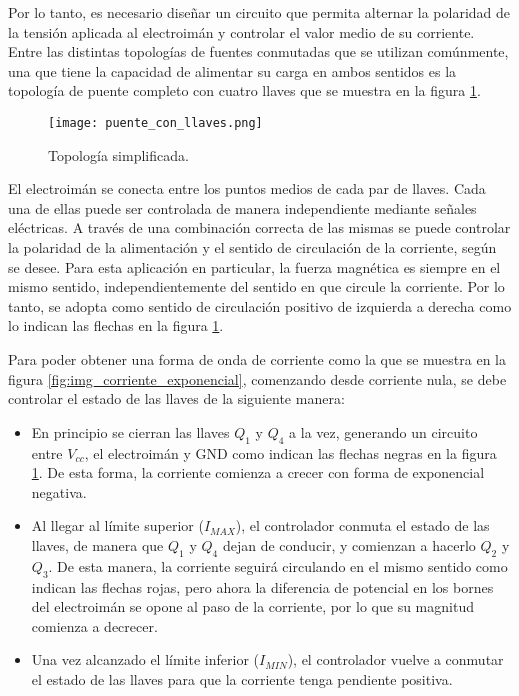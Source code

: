 
Por lo tanto, es necesario diseñar un circuito que permita alternar la polaridad de la tensión aplicada al electroimán y controlar el valor medio de su corriente. Entre las distintas topologías de fuentes conmutadas que se utilizan comúnmente, una que tiene la capacidad de alimentar su carga en ambos sentidos es la topología de puente completo con cuatro llaves que se muestra en la figura \ref{fig:img_topologia_simplificada}.

\begin{figure}[H]
	\centering
	\texttt{[image: puente\_con\_llaves.png]}
	\caption{Topología simplificada.}
	\label{fig:img_topologia_simplificada}
\end{figure} 


El electroimán se conecta entre los puntos medios de cada par de llaves. Cada una de ellas puede ser controlada de manera independiente mediante señales eléctricas. A través de una combinación correcta de las mismas se puede controlar la polaridad de la alimentación y el sentido de circulación de la corriente, según se desee. Para esta aplicación en particular, la fuerza magnética es siempre en el mismo sentido, independientemente del sentido en que circule la corriente. Por lo tanto, se adopta como sentido de circulación positivo de izquierda a derecha como lo indican las flechas en la figura \ref{fig:img_topologia_simplificada}.

Para poder obtener una forma de onda de corriente como la que se muestra en la figura \ref{fig:img_corriente_exponencial}, comenzando desde corriente nula, se debe controlar el estado de las llaves de la siguiente manera:

\begin{itemize}
	\item En principio se cierran las llaves $Q_1$ y $Q_4$ a la vez, generando un circuito entre $V_{cc}$, el electroimán y GND como indican las flechas negras en la figura \ref{fig:img_topologia_simplificada}. De esta forma, la corriente comienza a crecer con forma de exponencial negativa. 
	\item Al llegar al límite superior ($I_{MAX}$), el controlador conmuta el estado de las llaves, de manera que $Q_1$ y $Q_4$ dejan de conducir, y comienzan a hacerlo $Q_2$ y $Q_3$. De esta manera, la corriente seguirá circulando en el mismo sentido como indican las flechas rojas, pero ahora la diferencia de potencial en los bornes del electroimán se opone al paso de la corriente, por lo que su magnitud comienza a decrecer.
	\item Una vez alcanzado el límite inferior ($I_{MIN}$), el controlador vuelve a conmutar el estado de las llaves para que la corriente tenga pendiente positiva.
\end{itemize}

